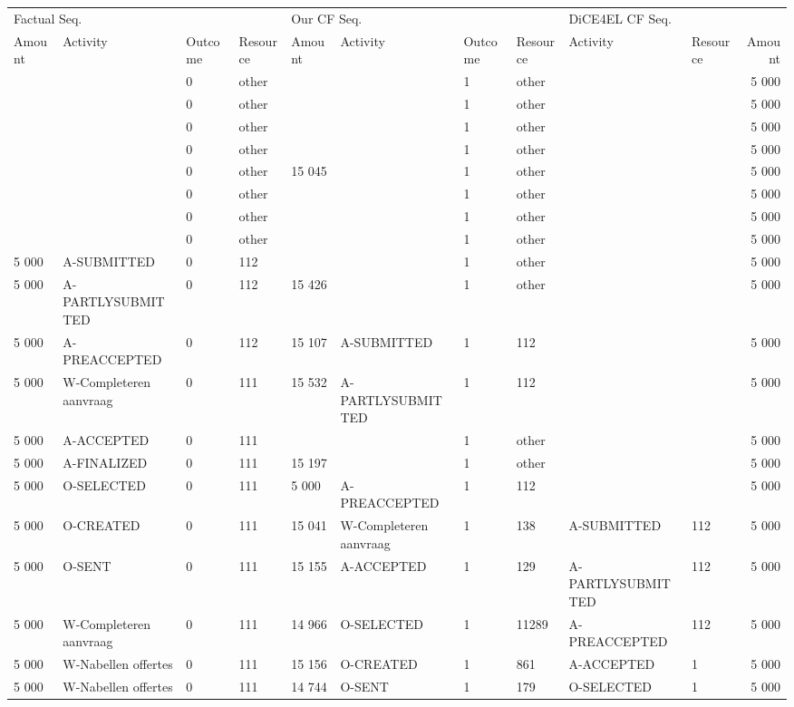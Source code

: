\begin{tabular}{llllllllllr}
\toprule
\multicolumn{4}{l}{Factual Seq.} & \multicolumn{4}{l}{Our CF Seq.} & \multicolumn{3}{l}{DiCE4EL CF Seq.} \\
Amount & Activity & Outcome & Resource & Amount & Activity & Outcome & Resource & Activity & Resource & Amount \\
\midrule
 &  & 0 & other &  &  & 1 & other &  &  & 5 000 \\
 &  & 0 & other &  &  & 1 & other &  &  & 5 000 \\
 &  & 0 & other &  &  & 1 & other &  &  & 5 000 \\
 &  & 0 & other &  &  & 1 & other &  &  & 5 000 \\
 &  & 0 & other & 15 045 &  & 1 & other &  &  & 5 000 \\
 &  & 0 & other &  &  & 1 & other &  &  & 5 000 \\
 &  & 0 & other &  &  & 1 & other &  &  & 5 000 \\
 &  & 0 & other &  &  & 1 & other &  &  & 5 000 \\
5 000 & A-SUBMITTED & 0 & 112 &  &  & 1 & other &  &  & 5 000 \\
5 000 & A-PARTLYSUBMITTED & 0 & 112 & 15 426 &  & 1 & other &  &  & 5 000 \\
5 000 & A-PREACCEPTED & 0 & 112 & 15 107 & A-SUBMITTED & 1 & 112 &  &  & 5 000 \\
5 000 & W-Completeren aanvraag & 0 & 111 & 15 532 & A-PARTLYSUBMITTED & 1 & 112 &  &  & 5 000 \\
5 000 & A-ACCEPTED & 0 & 111 &  &  & 1 & other &  &  & 5 000 \\
5 000 & A-FINALIZED & 0 & 111 & 15 197 &  & 1 & other &  &  & 5 000 \\
5 000 & O-SELECTED & 0 & 111 & 5 000 & A-PREACCEPTED & 1 & 112 &  &  & 5 000 \\
5 000 & O-CREATED & 0 & 111 & 15 041 & W-Completeren aanvraag & 1 & 138 & A-SUBMITTED & 112 & 5 000 \\
5 000 & O-SENT & 0 & 111 & 15 155 & A-ACCEPTED & 1 & 129 & A-PARTLYSUBMITTED & 112 & 5 000 \\
5 000 & W-Completeren aanvraag & 0 & 111 & 14 966 & O-SELECTED & 1 & 11289 & A-PREACCEPTED & 112 & 5 000 \\
5 000 & W-Nabellen offertes & 0 & 111 & 15 156 & O-CREATED & 1 & 861 & A-ACCEPTED & 1 & 5 000 \\
5 000 & W-Nabellen offertes & 0 & 111 & 14 744 & O-SENT & 1 & 179 & O-SELECTED & 1 & 5 000 \\

\end{tabular}

